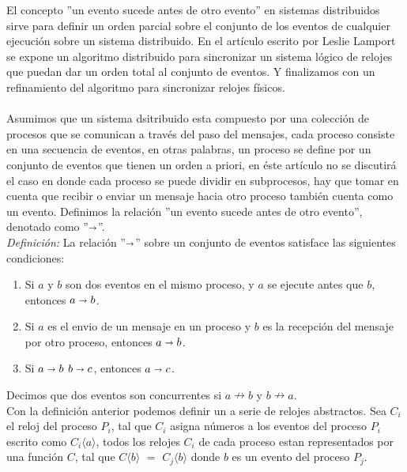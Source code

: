 \documentclass{article}
\begin{document}
\begin{enumerate}
{    El concepto ''un evento sucede antes de otro evento'' en sistemas
    distribuidos sirve para definir un orden parcial sobre el conjunto
    de los eventos de cualquier ejecución sobre un sistema
    distribuido. En el artículo escrito por Leslie Lamport se expone un
    algoritmo distribuido para sincronizar un sistema lógico de
    relojes que puedan dar un orden total al conjunto de eventos.
    Y finalizamos con un refinamiento del algoritmo para sincronizar
    relojes físicos.\\
    \\
    Asumimos que un sistema dsitribuido esta compuesto por una
    colección de procesos que se comunican a través del paso del
    mensajes, cada proceso consiste en una secuencia de eventos, en
    otras palabras, un proceso se define por un conjunto de eventos
    que tienen un orden a priori, en éste artículo no se discutirá el
    caso en donde cada proceso se puede dividir en subprocesos, hay
    que tomar en cuenta que recibir o enviar un mensaje hacia otro
    proceso también cuenta como un evento. Definimos la relación ''un
    evento sucede antes de otro evento'', denotado como
    ''$\shortrightarrow$''.\\ \textit{Definición:} La relación
    ''$\shortrightarrow$'' sobre un conjunto de eventos satisface las
    siguientes condiciones: 
    \begin{enumerate}
      \item{Si $a$ y $b$ son dos eventos en el mismo proceso, y $a$ se
        ejecute antes que $b$, entonces $a \shortrightarrow b$.}
      \item {Si $a$ es el envio de un mensaje en un proceso y $b$ es
          la recepción del mensaje por otro proceso, entonces $a
          \shortrightarrow b$.}
        \item{Si $a \shortrightarrow b$ $b \shortrightarrow c$,
            entonces $a \shortrightarrow c$.} 
    \end{enumerate}
    Decimos que dos eventos son concurrentes si $a \nrightarrow b$ y
    $b \nrightarrow a$.\\
    Con la definición anterior podemos definir un a serie de relojes
    abstractos. Sea $C_i$ el reloj del proceso $P_i$, tal que $C_i$
    asigna números a los eventos del proceso $P_i$ escrito como $C_i\langle a
    \rangle$, todos los relojes $C_i$ de cada proceso estan
    representados por una función $C$, tal que $C\langle b \rangle$
    $=$  $C_j\langle b \rangle$  donde $b$ es un evento del proceso
    $P_j$.\\
}
\end{enumerate}
\end{document}
